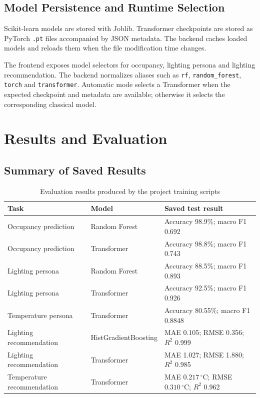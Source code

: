 \section{Model Persistence and Runtime Selection}

Scikit-learn models are stored with Joblib. Transformer checkpoints are stored
as PyTorch \texttt{.pt} files accompanied by JSON metadata. The backend caches
loaded models and reloads them when the file modification time changes.

The frontend exposes model selectors for occupancy, lighting persona and
lighting recommendation. The backend normalizes aliases such as
\texttt{rf}, \texttt{random\_forest}, \texttt{torch} and
\texttt{transformer}. Automatic mode selects a Transformer when the expected
checkpoint and metadata are available; otherwise it selects the corresponding
classical model.


\chapter{Results and Evaluation}
\label{chap:results}

\section{Summary of Saved Results}

\begin{table}[ht]
\centering
\caption{Evaluation results produced by the project training scripts}
\label{tab:project-model-results}
\begin{tabular}{|p{4.2cm}|p{4.0cm}|p{5.0cm}|}
\hline
\textbf{Task} & \textbf{Model} & \textbf{Saved test result} \\ \hline
Occupancy prediction &
Random Forest &
Accuracy 98.9\%; macro F1 0.692 \\ \hline
Occupancy prediction &
Transformer &
Accuracy 98.8\%; macro F1 0.743 \\ \hline
Lighting persona &
Random Forest &
Accuracy 88.5\%; macro F1 0.893 \\ \hline
Lighting persona &
Transformer &
Accuracy 92.5\%; macro F1 0.926 \\ \hline
Temperature persona &
Transformer &
Accuracy 80.55\%; macro F1 0.8848 \\ \hline
Lighting recommendation &
HistGradientBoosting &
MAE 0.105; RMSE 0.356; $R^2$ 0.999 \\ \hline
Lighting recommendation &
Transformer &
MAE 1.027; RMSE 1.880; $R^2$ 0.985 \\ \hline
Temperature recommendation &
Transformer &
MAE $0.217\,^{\circ}\mathrm{C}$; RMSE
$0.310\,^{\circ}\mathrm{C}$; $R^2$ 0.962 \\ \hline
\end{tabular}
\end{table}

